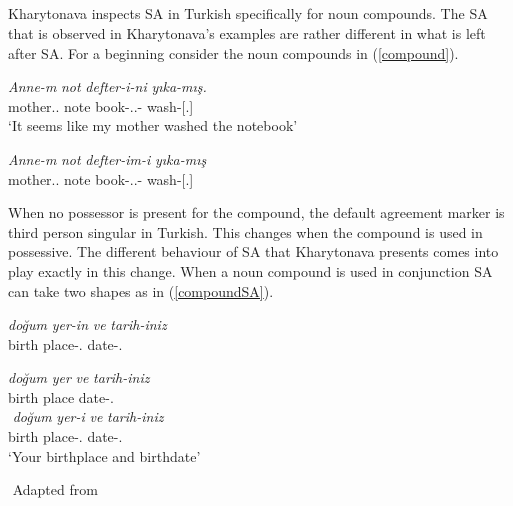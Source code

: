 \subsection{\cite{kharytonava2012word,kharytonava2012taming}}

Kharytonava inspects SA in Turkish specifically for noun compounds. The SA that is observed in Kharytonava's examples are rather different in what is left after SA. For a beginning consider the noun compounds in (\ref{compound}).

\begin{exe}
    \ex \label{compound}
    \begin{xlist}
        \ex \gll
        \textit{Anne-m} \textit{not} \textit{defter-i-ni} \textit{yıka-mış.} \\ mother.{\First}.{\Sg} note book-{\Poss}.{\Third}.{\Sg}-{\Acc} wash-{\Prf}[{\Third}.{\Sg}] \\
        \glt `It seems like my mother washed the notebook'
        
        \ex \gll 
        \textit{Anne-m} \textit{not} \textit{defter-im-i} \textit{yıka-mış} \\ mother.{\First}.{\Sg} note book-{\Poss}.{\First}.{\Sg}-{\Acc} wash-{\Prf}[{\Third}.{\Sg}] \\
    \end{xlist}
\end{exe}

When no possessor is present for the compound, the default agreement marker is third person singular in Turkish. This changes when the compound is used in possessive. The different behaviour of SA that Kharytonava presents comes into play exactly in this change. When a noun compound is used in conjunction SA can take two shapes as in (\ref{compoundSA}).

\begin{exe}
    \ex \label{compoundSA}
    \begin{xlist}
        \ex
        \gll 
        \textit{doğum} \textit{yer-in} \textit{ve} \textit{tarih-iniz} \\ birth place-{\Second}.{\Sg} {\And} date-{\Second}.{\Pl} \\
        \glt ${}$
        
        \ex \label{compoundSAb}
        \gll 
        \textit{doğum} \textit{yer} \textit{ve} \textit{tarih-iniz} \\ birth place {\And} date-{\Second}.{\Pl} \\
        \glt ${}$
        \ex \label{compoundSAc}
        \gll
        \textit{doğum} \textit{yer-i} \textit{ve} \textit{tarih-iniz} \\ birth place-{\Third}.{\Sg} {\And} date-{\Second}.{\Pl} \\
        \glt `Your birthplace and birthdate'
    \end{xlist}
    ${}$ \hfill Adapted from \cite{kharytonava2012taming}
\end{exe}

